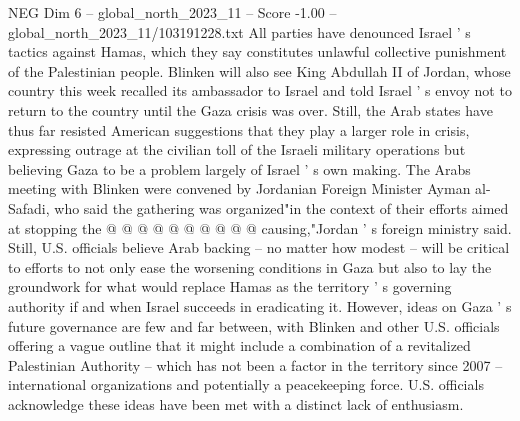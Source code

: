 \begin{textsample}{NEG Dim 6 – global\_north\_2023\_11 – Score -1.00 – global\_north\_2023\_11/103191228.txt}
All parties have denounced Israel ' s tactics against Hamas, which they say constitutes unlawful collective punishment of the Palestinian people.
Blinken will also see King Abdullah II of Jordan, whose country this week recalled its ambassador to Israel and told Israel ' s envoy not to return to the country until the Gaza crisis was over.
Still, the Arab states have thus far resisted American suggestions that they play a larger role in crisis, expressing outrage at the civilian toll of the Israeli military operations but believing Gaza to be a problem largely of Israel ' s own making.
The Arabs meeting with Blinken were convened by Jordanian Foreign Minister Ayman al-Safadi, who said the gathering was organized"in the context of their efforts aimed at stopping the @ @ @ @ @ @ @ @ @ @ causing,"Jordan ' s foreign ministry said.
Still, U.S. officials believe Arab backing -- no matter how modest -- will be critical to efforts to not only ease the worsening conditions in Gaza but also to lay the groundwork for what would replace Hamas as the territory ' s governing authority if and when Israel succeeds in eradicating it.
However, ideas on Gaza ' s future governance are few and far between, with Blinken and other U.S. officials offering a vague outline that it might include a combination of a revitalized Palestinian Authority -- which has not been a factor in the territory since 2007 -- international organizations and potentially a peacekeeping force.
U.S. officials acknowledge these ideas have been met with a distinct lack of enthusiasm.

\end{textsample}
